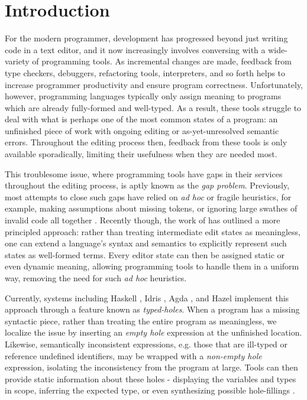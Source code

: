 \section{Introduction}

For the modern programmer, development has progressed beyond just writing code in a text editor, and it now increasingly involves conversing with a wide-variety of programming tools. As incremental changes are made, feedback from type checkers, debuggers, refactoring tools, interpreters, and so forth helps to increase programmer productivity and ensure program correctness. Unfortunately, however, programming languages typically only assign meaning to programs which are already fully-formed and well-typed. As a result, these tools struggle to deal with what is perhaps one of the most common states of a program: an unfinished piece of work with ongoing editing or as-yet-unresolved semantic errors. Throughout the editing process then, feedback from these tools is only available sporadically, limiting their usefulness when they are needed most.

This troublesome issue, where programming tools have gaps in their services throughout the editing process, is aptly known as the \emph{gap problem}. Previously, most attempts to close such gaps have relied on \textit{ad hoc} or fragile heuristics, for example, making assumptions about missing tokens, or ignoring large swathes of invalid code all together \cite{DBLP:conf/oopsla/KatsJNV09, DBLP:conf/snapl/OmarVHSGAH17}. Recently though, the work of  \cite{DBLP:conf/snapl/OmarVHSGAH17} has outlined a more principled approach: rather than treating intermediate edit states as meaningless, one can extend a language's syntax and semantics to explicitly represent such states as well-formed terms. Every editor state can then be assigned static or even dynamic meaning, allowing programming tools to handle them in a uniform way, removing the need for such \emph{ad hoc} heuristics.

Currently, systems including Haskell \cite{GHCHoles}, Idris \cite{DBLP:journals/jfp/Brady13}, Agda \cite{DBLP:conf/icfp/Norell13}, and Hazel \cite{DBLP:conf/popl/OmarVHAH17} implement this approach through a feature known as \emph{typed-holes}. When a program has a missing syntactic piece, rather than treating the entire program as meaningless, we localize the issue by inserting an \emph{empty hole} expression at the unfinished location. Likewise, semantically inconsistent expressions, e.g. those that are ill-typed or reference undefined identifiers, may be wrapped with a \emph{non-empty hole} expression, isolating the inconsistency from the program at large. Tools can then provide static information about these holes - displaying the variables and types in scope, inferring the expected type, or even synthesizing possible hole-fillings \cite{DBLP:conf/haskell/Gissurarson18, DBLP:journals/pacmpl/LubinCOC20}. 

